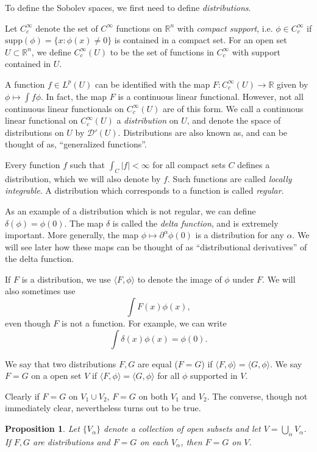 \documentclass[12pt,letterpaper,reqno]{article}
\theoremstyle{plain}                              %
\newtheorem{prop}[thm]{Proposition}
\theoremstyle{definition}                         %
\theoremstyle{remark}                             %
\numberwithin{equation}{section}
\newcommand{\R}{\mathbb{R}}                     %
\newcommand{\mcD}{\mathcal{D}}                     %
\begin{document}
To define the Sobolev spaces, we first need to define \textit{distributions}.

Let $C_c^\infty$ denote the set of $C^\infty$ functions on $\R^n$ with \textit{compact support}, i.e. $\phi\in C_c^\infty$ if $\mathrm{supp}( \phi) = \{x:\phi(x)\ne 0\}$ is contained in a compact set. For an open set $U\subset \R^n$, we define $C_c^\infty(U)$ to be the set of functions in $C_c^\infty$ with support contained in $U$. 

A function $f\in L^p(U)$ can be identified with the map $F: C_c^\infty(U) \to \R$ given by $\phi \mapsto \int f\phi$. In fact, the map $F$ is a continuous linear functional. However, not all continuous linear functionals on $C_c^\infty(U)$ are of this form. We call a continuous linear functional on $C_c^\infty(U)$ a \textit{distribution} on $U$, and denote the space of distributions on $U$ by $\mcD'(U)$. Distributions are also known as, and can be thought of as,  ``generalized functions''. 

Every function $f$ such that $\int_C |f|<\infty$ for all compact sets $C$ defines a distribution, which we will also denote by $f$. Such functions are called \textit{locally integrable}. A distribution which corresponds to a function is called \textit{regular}.

As an example of a distribution which is not regular, we can define $\delta(\phi) = \phi(0)$. The map $\delta$ is called the \textit{delta function}, and is extremely important. More generally, the map $\phi\mapsto \partial^\alpha \phi(0)$ is a distribution for any $\alpha$. We will see later how these maps can be thought of as ``distributional derivatives'' of the delta function.

If $F$ is a distribution, we use $\langle F, \phi\rangle$ to denote the image of $\phi$ under $F$. We will also sometimes use
\[\int F(x) \phi(x),\]
even though $F$ is not a function. For example, we can write
\[\int \delta(x) \phi(x) = \phi(0).\]

We say that two distributions $F,G$ are equal ($F=G$) if $\langle F,\phi\rangle = \langle G,\phi\rangle$. We say $F=G$ on a open set $V$ if $\langle F,\phi\rangle = \langle G,\phi\rangle$ for all $\phi$ supported in $V$.

Clearly if $F=G$ on $V_1\cup V_2$, $F=G$ on both $V_1$ and $V_2$. The converse, though not immediately clear, nevertheless turns out to be true.

\begin{prop}
    Let $\{V_\alpha\}$ denote a collection of open subsets and let $V = \bigcup_\alpha V_\alpha$. If $F,G$ are distributions and $F=G$ on each $V_\alpha$, then $F=G$ on $V$.
\end{prop}
\end{document}

